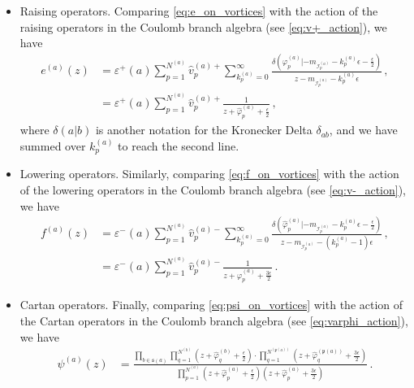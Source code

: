 \documentclass[12pt,a4paper]{article}
\renewcommand{\(}{\left(}
\renewcommand{\)}{\right)}
\renewcommand{\(}{\left(}
\renewcommand{\)}{\right)}
\begin{document}
\begin{itemize}
\item Raising operators.
Comparing \eqref{eq:e_on_vortices} with the action of the raising operators in the Coulomb branch algebra (see \eqref{eq:v+_action}), we have
\begin{equation}
\begin{aligned}
e^{(a)}(z)&=\varepsilon^+(a)\sum_{p=1}^{N^{(a)}} \hat{v}_{p}^{(a)+} \sum_{k^{(a)}_p=0}^{\infty} \frac{\delta(\hat{\varphi}^{(a)}_{p}|-m_{\mathcal{I}^{(a)}_{p}}-k^{(a)}_{p}\epsilon-\frac{\epsilon}{2})}{z-m_{\mathcal{I}^{(a)}_{p}}-k^{(a)}_{p}\epsilon}\,,\\  
&=\varepsilon^+(a)\sum_{p=1}^{N^{(a)}} \hat{v}^{(a)+}_{p}\frac{1}{z+\hat{\varphi}^{(a)}_{p}+\frac{\epsilon}{2}}\,,
\end{aligned}
\end{equation}
where $\delta(a|b)$ is another notation for the Kronecker Delta  $\delta_{ab}$, and we have summed over $k^{(a)}_p$ to reach the second line.

\item Lowering operators. 
Similarly, comparing \eqref{eq:f_on_vortices} with the action of the lowering operators in the Coulomb branch algebra (see \eqref{eq:v-_action}), we have
\begin{equation}
\begin{aligned}
f^{(a)}(z)&=\varepsilon^-(a)\sum_{p=1}^{N^{(a)}}\hat{v}^{(a)-}_{p}\sum_{k^{(a)}_{p}=0}^{\infty}\frac{\delta(\hat{\varphi}^{(a)}_{p}|-m_{\mathcal{I}^{(a)}_{p}}-k^{(a)}_{p}\epsilon-\frac{\epsilon}{2})}
{z-m_{\mathcal{I}^{(a)}_{p}}-(k^{(a)}_p-1)\epsilon}\,,\\
&=\varepsilon^-(a)\sum_{p=1}^{N^{(a)}}\hat{v}^{(a)-}_{p}\frac{1}{z+\hat{\varphi}^{(a)}_{p}+\frac{3\epsilon}{2}}\,.
\end{aligned}
\end{equation}

\item Cartan operators. 
Finally, comparing \eqref{eq:psi_on_vortices} with the action of the Cartan operators in the Coulomb branch algebra (see \eqref{eq:varphi_action}), we have
\begin{equation}
\begin{aligned}
\psi^{(a)}(z)&=\frac{\prod_{b\in \mathfrak{s}(a)}\prod_{q=1}^{N^{(b)}}(z+\hat{\varphi}^{(b)}_{q}+\frac{\epsilon}{2})\cdot\prod_{q=1}^{N^{(\mathfrak{p}(a))}}(z+\hat{\varphi}^{(\mathfrak{p}(a))}_{q}+\frac{3\epsilon}{2})}{\prod_{p=1}^{N^{(a)}}(z+\hat{\varphi}^{(a)}_{p}+\frac{\epsilon}{2})(z+\hat{\varphi}^{(a)}_{p}+\frac{3\epsilon}{2})}\,.\\
\end{aligned}
\end{equation}
\end{itemize}
\end{document}
